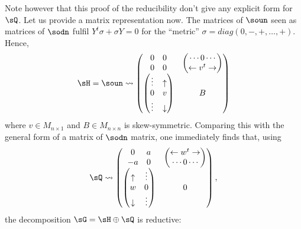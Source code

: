 Note however that this proof of the reducibility don't give any explicit form for $\sQ$. Let us provide a matrix representation now. The matrices of $\soun$ seen as matrices of $\sodn$ fulfil $Y^t\sigma+\sigma Y=0$ for the ``metric'' $\sigma=diag(0,-,+,\ldots,+)$. Hence,
\begin{equation}\label{eq:gene_H}
\sH=\soun\leadsto
  \begin{pmatrix}
     \begin{matrix}
       0&0\\
       0&0
     \end{matrix}
                       &  \begin{pmatrix}
		             \cdots 0\cdots\\
			    \leftarrow v^t\rightarrow
                          \end{pmatrix}\\
    \begin{pmatrix}	  
       \vdots & \uparrow\\
         0    & v \\
       \vdots & \downarrow
    \end{pmatrix} &  B
  \end{pmatrix}
\end{equation}
where  $v\in M_{n\times 1}$ and $B\in M_{n\times n}$ is skew-symmetric. Comparing this with the general form of a matrix of $\sodn$ matrix, one immediately finds that, using
\begin{equation}\label{eq:gene_M}
\sQ\leadsto
 \begin{pmatrix}
     \begin{matrix}
       0&a\\
       -a&0
     \end{matrix}
                       &  \begin{pmatrix}		             
			  \leftarrow w^t\rightarrow \\
			     \cdots 0\cdots\\
                          \end{pmatrix}\\
    \begin{pmatrix}	  
      \uparrow   & \vdots\\
          w      &  0\\
      \downarrow & \vdots 
    \end{pmatrix} & 0
  \end{pmatrix},
 \end{equation}
the decomposition $\sG=\sH\oplus\sQ$ is reductive:
